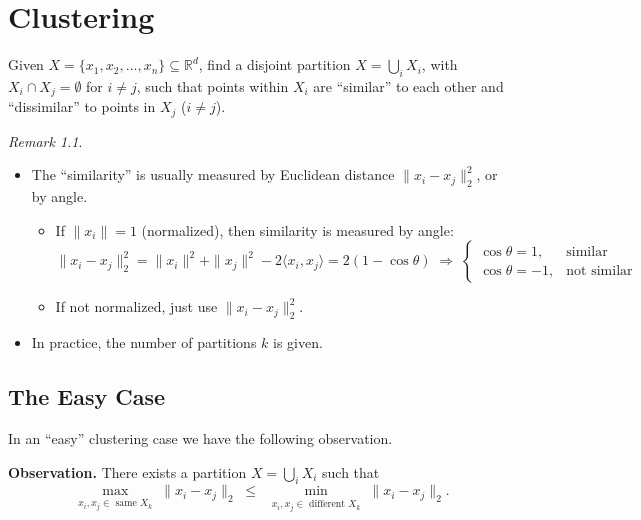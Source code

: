 \documentclass[
  letterpaper,
  DIV=11,
  numbers=noendperiod]{scrreprt}
\providecommand{\tightlist}{%
  \setlength{\itemsep}{0pt}\setlength{\parskip}{0pt}}
\theoremstyle{definition}
\theoremstyle{plain}
\theoremstyle{plain}
\theoremstyle{definition}
\theoremstyle{plain}
\theoremstyle{plain}
\theoremstyle{remark}
\newtheorem*{remark}{Remark}
\begin{document}
\chapter{Clustering}\label{clustering}

Given \(X = \{x_1, x_2, \dots, x_n\} \subseteq \mathbb{R}^d\), find a
disjoint partition \(X = \bigcup_i X_i\), with
\(X_i \cap X_j = \emptyset\) for \(i \ne j\), such that points within
\(X_i\) are ``similar'' to each other and ``dissimilar'' to points in
\(X_j\) (\(i \ne j\)).

\begin{remark}
\leavevmode

\begin{itemize}
\tightlist
\item
  The ``similarity'' is usually measured by Euclidean distance
  \(\|x_i - x_j\|_2^2\), or by angle.

  \begin{itemize}
  \tightlist
  \item
    If \(\|x_i\| = 1\) (normalized), then similarity is measured by
    angle: \[
    \|x_i - x_j\|_2^2 = \|x_i\|^2 + \|x_j\|^2 - 2\langle x_i, x_j\rangle = 2(1 - \cos\theta)
    \;\Rightarrow\;
    \begin{cases} \cos\theta = 1, & \text{similar} \\ \cos\theta = -1, & \text{not similar} \end{cases}
    \]
  \item
    If not normalized, just use \(\|x_i - x_j\|_2^2\).
  \end{itemize}
\item
  In practice, the number of partitions \(k\) is given.
\end{itemize}

\end{remark}

\section{The Easy Case}\label{the-easy-case}

In an ``easy'' clustering case we have the following observation.

\textbf{Observation.} There exists a partition \(X = \bigcup_i X_i\)
such that \[
\max_{\substack{x_i, x_j \in \text{ same } X_k}} \|x_i - x_j\|_2
\;\le\;
\min_{\substack{x_i, x_j \in \text{ different } X_k}} \|x_i - x_j\|_2 .
\]
\end{document}
